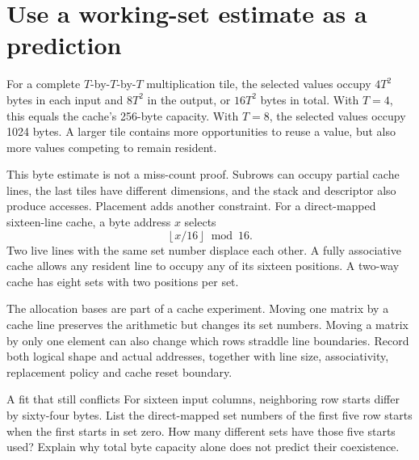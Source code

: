 \section{Use a working-set estimate as a prediction}
For a complete \(T\)-by-\(T\)-by-\(T\) multiplication tile, the selected values
occupy \(4T^2\) bytes in each input and \(8T^2\) in the output, or \(16T^2\)
bytes in total. With \(T=4\), this equals the cache's 256-byte capacity. With
\(T=8\), the selected values occupy 1024 bytes. A larger tile contains more
opportunities to reuse a value, but also more values competing to remain resident.

This byte estimate is not a miss-count proof. Subrows can occupy partial cache
lines, the last tiles have different dimensions, and the stack and descriptor
also produce accesses. Placement adds another constraint. For a direct-mapped
sixteen-line cache, a byte address \(x\) selects
\[
 \left\lfloor x/16\right\rfloor\bmod16.
\]
Two live lines with the same set number displace each other. A fully associative
cache allows any resident line to occupy any of its sixteen positions. A two-way
cache has eight sets with two positions per set.

The allocation bases are part of a cache experiment. Moving one matrix by a cache
line preserves the arithmetic but changes its set numbers. Moving a matrix by
only one element can also change which rows straddle line boundaries. Record both
logical shape and actual addresses, together with line size, associativity,
replacement policy and cache reset boundary.

\begin{MARSExercise}{A fit that still conflicts}
For sixteen input columns, neighboring row starts differ by sixty-four bytes.
List the direct-mapped set numbers of the first five row starts when the first
starts in set zero. How many different sets have those five starts used? Explain
why total byte capacity alone does not predict their coexistence.
\end{MARSExercise}

